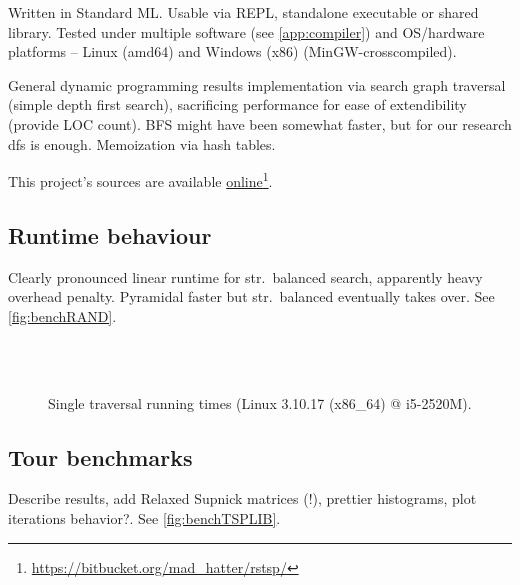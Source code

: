 \documentclass{scrartcl}
\newcommand{\annotation}[1]{\marginpar{\small\itshape\color{green}#1}}
\begin{document}
Written in {\ttfamily Standard ML}.
Usable via REPL, standalone executable or shared library.
Tested under multiple software (see \autoref{app:compiler}) and OS/hardware platforms --
Linux (amd64) and Windows (x86) (MinGW-crosscompiled).

General dynamic programming results implementation via search graph traversal (simple depth first search),
sacrificing performance for ease of extendibility (provide LOC count).
BFS might have been somewhat faster, but for our research dfs is enough.
Memoization via hash tables.

This project's sources are available
\href{https://bitbucket.org/mad_hatter/rstsp/}{online}\footnote{\url{https://bitbucket.org/mad_hatter/rstsp/}}.

\subsection{Runtime behaviour}
\annotation{TODO}

Clearly pronounced linear runtime for str.~balanced search, apparently heavy overhead penalty.
Pyramidal faster but str.~balanced eventually takes over.
See \autoref{fig:benchRAND}.

\begin{figure}[htbp]
\null\hfill%
\hfill\null
\null\hfill%
\hfill\null\\
\null\hfill%
\hfill\null\\
\null\hfill%
\hfill\null
\null\hfill%
\hfill\null
\caption{Single traversal running times (Linux 3.10.17 ({\ttfamily x86\_64}) @ i5-2520M).}
\label{fig:benchRAND}
\end{figure}

\subsection{Tour benchmarks}

\annotation{TODO}
Describe results, add Relaxed Supnick matrices (!), prettier histograms, plot iterations behavior?.
See \autoref{fig:benchTSPLIB}.
\end{document}
